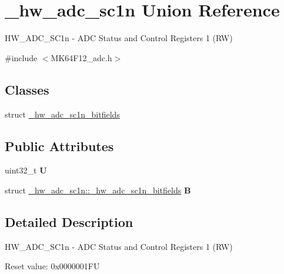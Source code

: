 \hypertarget{union__hw__adc__sc1n}{}\section{\+\_\+hw\+\_\+adc\+\_\+sc1n Union Reference}
\label{union__hw__adc__sc1n}


H\+W\+\_\+\+A\+D\+C\+\_\+\+S\+C1n -\/ A\+DC Status and Control Registers 1 (RW)  




{\ttfamily \#include $<$M\+K64\+F12\+\_\+adc.\+h$>$}

\subsection*{Classes}
\begin{DoxyCompactItemize}
\item 
struct \hyperlink{struct__hw__adc__sc1n_1_1__hw__adc__sc1n__bitfields}{\+\_\+hw\+\_\+adc\+\_\+sc1n\+\_\+bitfields}
\end{DoxyCompactItemize}
\subsection*{Public Attributes}
\begin{DoxyCompactItemize}
\item 
uint32\+\_\+t {\bfseries U}\hypertarget{union__hw__adc__sc1n_a667b2bfff2168d56420403c84e543579}{}\label{union__hw__adc__sc1n_a667b2bfff2168d56420403c84e543579}

\item 
struct \hyperlink{struct__hw__adc__sc1n_1_1__hw__adc__sc1n__bitfields}{\+\_\+hw\+\_\+adc\+\_\+sc1n\+::\+\_\+hw\+\_\+adc\+\_\+sc1n\+\_\+bitfields} {\bfseries B}\hypertarget{union__hw__adc__sc1n_a11663ceb840d67051ae1dd1a14ee30e6}{}\label{union__hw__adc__sc1n_a11663ceb840d67051ae1dd1a14ee30e6}

\end{DoxyCompactItemize}


\subsection{Detailed Description}
H\+W\+\_\+\+A\+D\+C\+\_\+\+S\+C1n -\/ A\+DC Status and Control Registers 1 (RW) 

Reset value\+: 0x0000001\+FU


